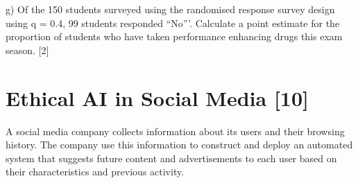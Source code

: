 \documentclass[a4paper, 11pt]{article}
\begin{document}
%
%


g) Of the 150 students surveyed using the randomised response survey design using q = 0.4, 99 students responded ``No'''. Calculate a point estimate for the proportion of students who have taken performance enhancing drugs this exam season. [2]

%
%
%

\section{Ethical AI in Social Media [10] }

A social media company collects information about its users and their browsing history. The company use this information to construct and deploy an automated system that suggests future content and advertisements to each user based on their characteristics and previous activity.  
\end{document}
